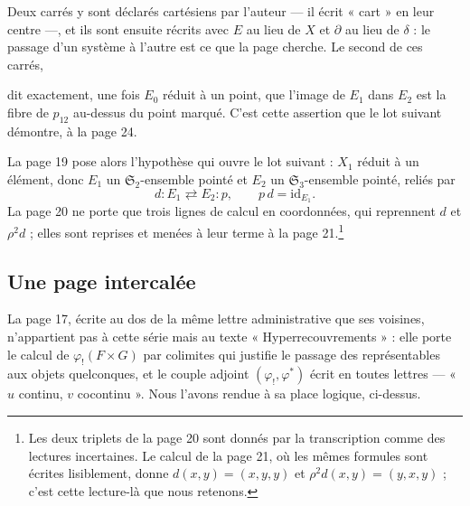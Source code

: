 \documentclass[11pt,a4paper]{article}
\begin{document}
Deux carrés y sont déclarés cartésiens par l'auteur — il écrit « cart » en leur
centre —, et ils sont ensuite récrits avec $E$ au lieu de $X$ et $\partial$ au
lieu de $\delta$ : le passage d'un système à l'autre est ce que la page cherche.
Le second de ces carrés,

dit exactement, une fois $E_{0}$ réduit à un point, que l'image de $E_{1}$ dans
$E_{2}$ est la fibre de $p_{12}$ au-dessus du point marqué. C'est cette
assertion que le lot suivant démontre, à la page 24.

La page 19 pose alors l'hypothèse qui ouvre le lot suivant : $X_{1}$ réduit à un
élément, donc $E_{1}$ un $\mathfrak{S}_{2}$-ensemble pointé et $E_{2}$ un
$\mathfrak{S}_{3}$-ensemble pointé, reliés par
\[
  d \colon E_{1} \rightleftarrows E_{2} \colon p, \qquad p\,d = \mathrm{id}_{E_{1}}.
\]
La page 20 ne porte que trois lignes de calcul en coordonnées, qui reprennent
$d$ et $\rho^{2}d$ ; elles sont reprises et menées à leur terme à la page
21.\footnote{Les deux triplets de la page 20 sont donnés par la transcription
comme des lectures incertaines. Le calcul de la page 21, où les mêmes formules
sont écrites lisiblement, donne $d(x,y) = (x,y,y)$ et
$\rho^{2}d(x,y) = (y,x,y)$ ; c'est cette lecture-là que nous retenons.}

\subsection*{Une page intercalée}

La page 17, écrite au dos de la même lettre administrative que ses voisines,
n'appartient pas à cette série mais au texte « Hyperrecouvrements » : elle
porte le calcul de $\varphi_{!}(F \times G)$ par colimites qui justifie le
passage des représentables aux objets quelconques, et le couple adjoint
$(\varphi_{!}, \varphi^{*})$ écrit en toutes lettres — « $u$ continu, $v$
cocontinu ». Nous l'avons rendue à sa place logique, ci-dessus.
\end{document}
